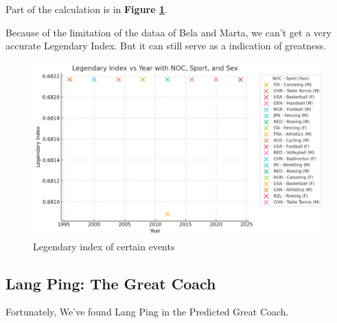 Part of the calculation is in \textbf{Figure \ref{fig:legendary_index_detailed}}.

Because of the limitation of the dataa of Bela and Marta, we can't get a very accurate Legendary Index. But it can still serve as a indication of greatness.

\begin{figure}[h]
\centering
    \includegraphics[width=1\textwidth]{./figures/Lengendary_index_detailed.png}
    \caption{Legendary index of certain events}
    \label{fig:legendary_index_detailed}
\end{figure}

\subsection{Lang Ping: The Great Coach}

Fortunately, We've found Lang Ping in the Predicted Great Coach.

